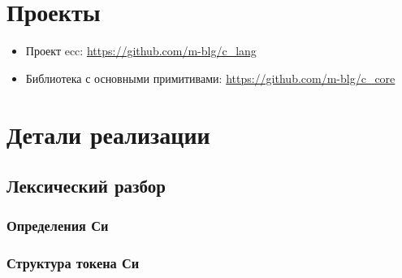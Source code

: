 
\chapter{Проекты}
\begin{itemize}
\item\label{extras:ecc} Проект ecc: \url{https://github.com/m-blg/c_lang}

\item\label{extras:c-core} Библиотека с основными примитивами: \url{https://github.com/m-blg/c_core}
\end{itemize}


\chapter{Детали реализации}
% 

% 

% 


\section*{Лексический разбор}

\subsection*{Определения Си}


\subsection*{Структура токена Си}


